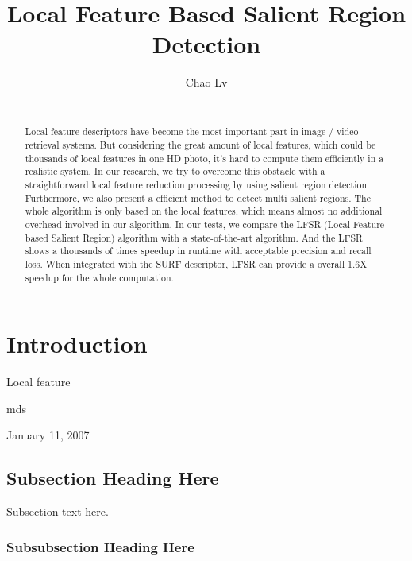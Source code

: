 \documentclass[conference]{acm_proc_article-sp}
\begin{document}
\title{Local Feature Based Salient Region Detection}
\author{
\alignauthor
Chao Lv\\
       \\
}
\maketitle


\begin{abstract}

Local feature descriptors have become the most important part in image / video retrieval systems. But considering the great amount of local features, which could be thousands of local features in one HD photo, it's hard to compute them efficiently in a realistic system. In our research, we try to overcome this obstacle with a straightforward local feature reduction processing by using salient region detection. Furthermore, we also present a efficient method to detect multi salient regions. The whole algorithm is only based on the local features, which means almost no additional overhead involved in our algorithm. In our tests, we compare the LFSR (Local Feature based Salient Region) algorithm with a state-of-the-art algorithm. And the LFSR shows a thousands of times speedup in runtime with acceptable precision and recall loss. When integrated with the SURF descriptor, LFSR can provide a overall 1.6X speedup for the whole computation.

\end{abstract}


\section{Introduction}

Local feature 

\hfill mds
 
\hfill January 11, 2007

\subsection{Subsection Heading Here}

Subsection text here.


\subsubsection{Subsubsection Heading Here}
\end{document}
